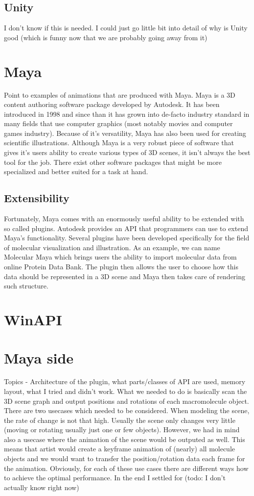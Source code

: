 \documentclass[
  digital, %
  table,   %
  lof,     %
  lot,     %
]{fithesis3}
\begin{document}
\subsection{Unity}
I don't know if this is needed. I could just go little bit into detail of why is Unity good (which is funny now that we are probably going away from it)
\section{Maya}
Point to examples of animations that are produced with Maya.
Maya is a 3D content authoring software package developed by Autodesk. It has been introduced in 1998 and since than it has grown into de-facto industry standard in many fields that use computer graphics (most notably movies and computer games industry). Because of it's versatility, Maya has also been used for creating scientific illustrations.
Although Maya is a very robust piece of software that gives it's users ability to create various types of 3D scenes, it isn't always the best tool for the job. There exist other software packages that might be more specialized and better suited for a task at hand.
\subsection{Extensibility}
Fortunately, Maya comes with an enormously useful ability to be extended with so called plugins. Autodesk provides an API that programmers can use to extend Maya's functionality.
Several plugins have been developed specifically for the field of molecular visualization and illustration. As an example, we can name Molecular Maya which brings users the ability to import molecular data from online Protein Data Bank. The plugin then allows the user to choose how this data should be represented in a 3D scene and Maya then takes care of rendering such structure.

\section{WinAPI}
\section{Maya side}
Topics - Architecture of the plugin, what parts/classes of API are used, memory layout, what I tried and didn't work.
What we needed to do is basically scan the 3D scene graph and output positions and rotations of each macromolecule object. There are two usecases which needed to be considered. When modeling the scene, the rate of change is not that high. Usually the scene only changes very little (moving or rotating usually just one or few objects). However, we had in mind also a usecase where the animation of the scene would be outputed as well. This means that artist would create a keyframe animation of (nearly) all molecule objects and we would want to transfer the position/rotation data each frame for the animation. Obviously, for each of these use cases there are different ways how to achieve the optimal performance. In the end I settled for (todo: I don't actually know right now)
\end{document}
